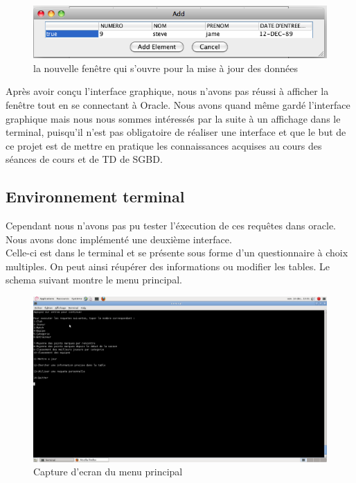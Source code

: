\documentclass{article}
\begin{document}
\begin{figure}[!h]
\centering
\includegraphics[scale = 0.4] {4.png}
\caption{la nouvelle fenêtre qui s'ouvre pour la mise à jour des données}
\end{figure}


Après avoir conçu l'interface graphique, nous n'avons pas réussi à afficher la fenêtre tout en se connectant à Oracle. Nous avons quand même gardé l'interface graphique mais nous nous sommes intéressés par la suite à un affichage dans le terminal, puisqu'il n'est pas obligatoire de réaliser une interface et que le but de ce projet est de mettre en pratique les connaissances acquises au cours des séances de cours et de TD de SGBD. 

\newpage
\subsection{Environnement terminal}

Cependant nous n'avons pas pu tester l'éxecution de ces requêtes dans oracle. Nous avons donc implémenté une deuxième interface.\\
Celle-ci est dans le terminal et se présente sous forme d'un questionnaire à choix multiples. On peut ainsi réupérer des informations ou modifier les tables. Le schema suivant montre le menu principal.\\

\begin{figure}[h!]
\begin{narrow}{-0.3in}{0in}
\includegraphics[scale = 0.3]{TerGUI.png}
\caption{Capture d'ecran du menu principal}
\end{narrow}
\end{figure}
\end{document}
